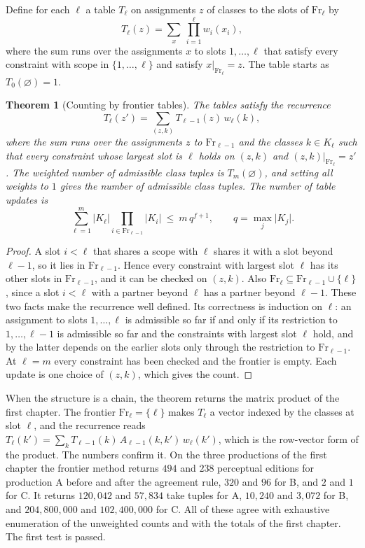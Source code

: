 \documentclass[11pt,twoside,openright]{book}
\theoremstyle{plain}
\newtheorem{theorem}{Theorem}[chapter]
\theoremstyle{definition}
\theoremstyle{remark}
\newcommand{\Fr}{\mathrm{Fr}}
\begin{document}
Define for each $\ell$ a table $T_\ell$ on assignments $z$ of classes to the slots of $\Fr_\ell$ by
\[
T_\ell(z)=\sum_{x}\ \prod_{i=1}^{\ell}w_i(x_i),
\]
where the sum runs over the assignments $x$ to slots $1,\dots,\ell$ that satisfy every constraint with scope in $\{1,\dots,\ell\}$ and satisfy $x|_{\Fr_\ell}=z$. The table starts as $T_0(\varnothing)=1$.

\begin{theorem}[Counting by frontier tables]\label{thm:frontier}
The tables satisfy the recurrence
\[
T_\ell(z')=\sum_{(z,k)}T_{\ell-1}(z)\,w_\ell(k),
\]
where the sum runs over the assignments $z$ to $\Fr_{\ell-1}$ and the classes $k\in K_\ell$ such that every constraint whose largest slot is $\ell$ holds on $(z,k)$ and $(z,k)|_{\Fr_\ell}=z'$. The weighted number of admissible class tuples is $T_m(\varnothing)$, and setting all weights to $1$ gives the number of admissible class tuples. The number of table updates is
\[
\sum_{\ell=1}^m\lvert K_\ell\rvert\prod_{i\in\Fr_{\ell-1}}\lvert K_i\rvert\ \le\ m\,q^{f+1},\qquad q=\max_j\lvert K_j\rvert .
\]
\end{theorem}

\begin{proof}
A slot $i<\ell$ that shares a scope with $\ell$ shares it with a slot beyond $\ell-1$, so it lies in $\Fr_{\ell-1}$. Hence every constraint with largest slot $\ell$ has its other slots in $\Fr_{\ell-1}$, and it can be checked on $(z,k)$. Also $\Fr_\ell\subseteq\Fr_{\ell-1}\cup\{\ell\}$, since a slot $i<\ell$ with a partner beyond $\ell$ has a partner beyond $\ell-1$. These two facts make the recurrence well defined. Its correctness is induction on $\ell$: an assignment to slots $1,\dots,\ell$ is admissible so far if and only if its restriction to $1,\dots,\ell-1$ is admissible so far and the constraints with largest slot $\ell$ hold, and by  the latter depends on the earlier slots only through the restriction to $\Fr_{\ell-1}$. At $\ell=m$ every constraint has been checked and the frontier is empty. Each update is one choice of $(z,k)$, which gives the count.
\end{proof}

When the structure is a chain, the theorem returns the matrix product of the first chapter. The frontier $\Fr_\ell=\{\ell\}$ makes $T_\ell$ a vector indexed by the classes at slot $\ell$, and the recurrence reads $T_\ell(k')=\sum_kT_{\ell-1}(k)\,A_{\ell-1}(k,k')\,w_\ell(k')$, which is the row-vector form of the product. The numbers confirm it. On the three productions of the first chapter the frontier method returns $494$ and $238$ perceptual editions for production A before and after the agreement rule, $320$ and $96$ for B, and $2$ and $1$ for C. It returns $120{,}042$ and $57{,}834$ take tuples for A, $10{,}240$ and $3{,}072$ for B, and $204{,}800{,}000$ and $102{,}400{,}000$ for C. All of these agree with exhaustive enumeration of the unweighted counts and with the totals of the first chapter. The first test is passed.
\end{document}
